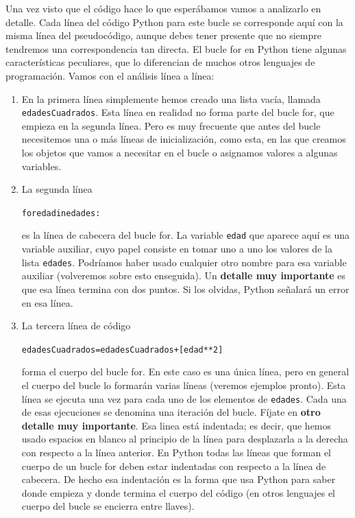 \documentclass[10pt,a4paper]{article}\usepackage[]{graphicx}\usepackage[]{color}
\makeatletter
\newenvironment{kframe}{%
 \def\at@end@of@kframe{}%
 \ifinner\ifhmode%
  \def\at@end@of@kframe{\end{minipage}}%
  \begin{minipage}{\columnwidth}%
 \fi\fi%
 \def\FrameCommand##1{\hskip\@totalleftmargin \hskip-\fboxsep
 \colorbox{shadecolor}{##1}\hskip-\fboxsep
     \hskip-\linewidth \hskip-\@totalleftmargin \hskip\columnwidth}%
 \MakeFramed {\advance\hsize-\width
   \@totalleftmargin\z@ \linewidth\hsize
   \@setminipage}}%
 {\par\unskip\endMakeFramed%
 \at@end@of@kframe}
\newenvironment{knitrout}{}{} %
\makeatother
\begin{document}
Una vez visto que el código hace lo que esperábamos vamos a analizarlo en detalle. Cada línea del código Python para este bucle se corresponde aquí con la misma línea del pseudocódigo, aunque debes tener presente que no siempre tendremos una correspondencia tan directa. El bucle for en Python tiene algunas características peculiares, que lo diferencian de muchos otros lenguajes de programación. Vamos con el análisis línea a línea:
\begin{enumerate}
\item En la primera línea simplemente hemos creado una lista vacía, llamada {\tt edadesCuadrados}. Esta línea en realidad no forma parte del bucle for, que empieza en la segunda línea. Pero es muy frecuente que antes del bucle necesitemos una o más {\sf líneas de inicialización}, como esta, en las que creamos los objetos que vamos a necesitar en el bucle o asignamos valores a algunas variables.

\item La segunda línea
\begin{knitrout}
\color{fgcolor}\begin{kframe}
\begin{alltt}
for edad in edades:
\end{alltt}
\end{kframe}
\end{knitrout}
es la {\sf línea de cabecera del bucle for}. La variable {\tt edad} que aparece aquí es una {\sf variable auxiliar}, cuyo papel consiste en tomar uno a uno los valores de la lista {\tt edades}. Podríamos haber usado cualquier otro nombre para esa variable auxiliar (volveremos sobre esto enseguida). Un {\bf detalle muy importante} es que esa línea termina con dos puntos. Si los olvidas, Python señalará un error en esa línea.

\item La tercera línea de código
\begin{knitrout}
\color{fgcolor}\begin{kframe}
\begin{alltt}
  edadesCuadrados = edadesCuadrados + [edad**2]
\end{alltt}
\end{kframe}
\end{knitrout}
forma el {\sf cuerpo del bucle for}. En este caso es una única línea, pero en general el cuerpo del bucle lo formarán varias líneas (veremos ejemplos pronto). Esta línea se ejecuta una vez para cada uno de los elementos de {\tt edades}. Cada una de esas ejecuciones se denomina una {\sf iteración} del bucle. Fíjate en {\bf otro detalle muy importante}. Esa linea está {\sf indentada}; es decir, que hemos usado espacios en blanco al principio de la línea para desplazarla a la derecha con respecto a la línea anterior. En Python todas las líneas que forman el cuerpo de un bucle for deben estar indentadas con respecto a la línea de cabecera. De hecho esa indentación es la forma que usa Python para saber donde empieza y donde termina el cuerpo del código (en otros lenguajes el cuerpo del bucle se encierra entre llaves).


\end{enumerate}
\end{document}
